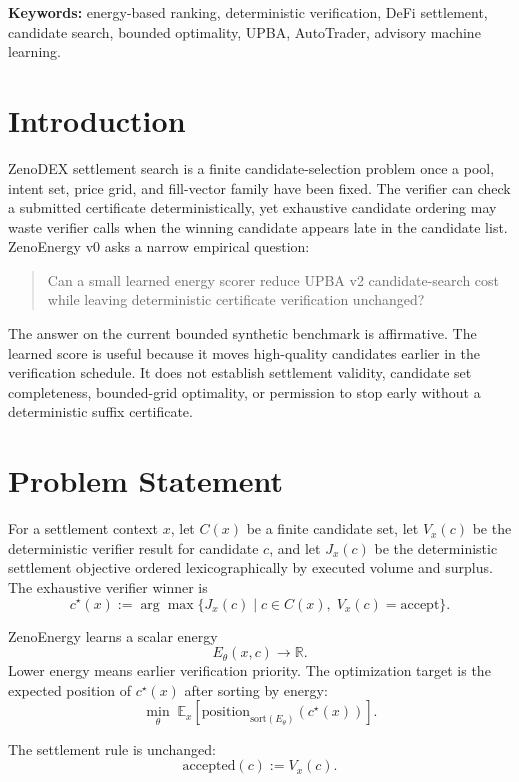 \documentclass[11pt]{article}
\begin{document}
\noindent\textbf{Keywords:} energy-based ranking, deterministic verification,
DeFi settlement, candidate search, bounded optimality, UPBA, AutoTrader,
advisory machine learning.

\section{Introduction}

ZenoDEX settlement search is a finite candidate-selection problem once a pool,
intent set, price grid, and fill-vector family have been fixed. The verifier can
check a submitted certificate deterministically, yet exhaustive candidate
ordering may waste verifier calls when the winning candidate appears late in the
candidate list. ZenoEnergy v0 asks a narrow empirical question:

\begin{quote}
Can a small learned energy scorer reduce UPBA v2 candidate-search cost while
leaving deterministic certificate verification unchanged?
\end{quote}

The answer on the current bounded synthetic benchmark is affirmative. The
learned score is useful because it moves high-quality candidates earlier in the
verification schedule. It does not establish settlement validity, candidate
set completeness, bounded-grid optimality, or permission to stop early without a
deterministic suffix certificate.

\section{Problem Statement}

For a settlement context $x$, let $C(x)$ be a finite candidate set, let
$V_x(c)$ be the deterministic verifier result for candidate $c$, and let
$J_x(c)$ be the deterministic settlement objective ordered lexicographically by
executed volume and surplus. The exhaustive verifier winner is
\[
  c^\star(x) := \arg\max \{ J_x(c) \mid c \in C(x),\; V_x(c)=\mathrm{accept}\}.
\]

ZenoEnergy learns a scalar energy
\[
  E_\theta(x,c) \rightarrow \mathbb{R}.
\]
Lower energy means earlier verification priority. The optimization target is
the expected position of $c^\star(x)$ after sorting by energy:
\[
  \min_\theta\; \mathbb{E}_x[\mathrm{position}_{\mathrm{sort}(E_\theta)}(c^\star(x))].
\]

The settlement rule is unchanged:
\[
  \mathrm{accepted}(c) := V_x(c).
\]
\end{document}
